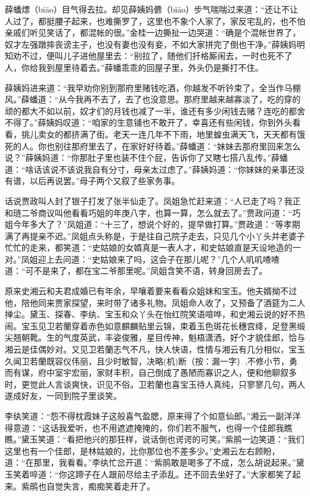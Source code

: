 \documentclass[12pt,oneside]{book}
\begin{document}
薛蟠熛（biāo）目气得去拉。却见薛姨妈儦（biāo）步气喘喘过来道：“还让不让人过了，都挺腰子起来，也难撕罗了，这里也不象个人家了，家反宅乱的，也不怕亲戚们听见笑话了，都混帐的很。”金桂一边撕扯一边哭道：“确是个混帐世界了，奴才左强蹾摔丧谤主子，也没有妻也没有妾，不如大家拼完了倒也干净。”薛姨妈明知劝不过，便叫儿子进他屋里去：“别拉了，随他们扞格厮闹去，一时也死不了人，你给我到屋里待着去。”薛蟠乖乖的回屋子里，外头仍是撕打不住。

薛姨妈进来道：“我早劝你别到那府里赌钱吃酒，你越发不听钤束了，全当作马棚风。”薛蟠道：“从今我再不去了，去了也没意思。那府里越来越寡淡了，吃的穿的顽的都大不如以前，奴才们的月钱也减了一半，谁还有多少闲钱去赌？连吃的都舍不得了。”薛姨妈叹道：“咱家的生意铺也不敢开了，幸喜还有些闲钱，你到外头看看，挑儿卖女的都挤满了街。老天一连几年不下雨，地里蝗虫满天飞，天天都有饿死的人。你也别往那府里去了，在家好好待着。”薛蟠道：“妹妹去那府里回来怎么说？”薛姨妈道：“你那肚子里也装不住个屁，告诉你了又瞎七搭八乱传。”薛蟠道：“啥话该说不该说我自有分寸，母亲太过虑了。”薛姨妈道：“你妹妹的亲事还没有谱，以后再说罢。”母子两个又叙了些家务事。

话说贾政叫人封了银子打发了张半仙走了。凤姐急忙赶来道：“人已走了吗？我正和琏二爷商议叫他看看巧姐的年庚八字，也算一算，怎么就去了。”贾政问道：“巧姐今年多大了？”凤姐道：“十三了，想说个好的，提早做打算。”贾政道：“等孝期满了再提亲不迟。”凤姐点头称是，于是往自己院子走去，只见几个小丫头并老婆子忙忙的走来，都笑道：“史姑娘的女婿真是一表人才，和史姑娘直是天设地造的一对。”凤姐迎上去问道：“史姑娘来了吗，这会子在那儿呢？”几个人叽叽喳喳道：“可不是来了，都在宝二爷那里呢。”凤姐含笑不语，转身回房去了。

原来史湘云和夫君成婚已有年余，早嚷着要来看看众姐妹和宝玉。他夫婿拗不过他，陪他同来贾家探望，来时带了诸多礼物。凤姐命人收了，又预备了酒筵为二人掸尘。黛玉、探春、李纨、宝玉和众丫头在怡红院笑语喧哗，和史湘云说的好不热闹。宝玉见卫若蘭穿着赤色如意麒麟贴里云锦，束着玉色斑花长穗宫绛，足登黑缎尖翘朝靴。生的气度英武，丰姿俊雅，星目传神，魁梧潇洒，好个才貌佳郎，恰与湘云是佳偶妙对。又见卫若蘭志气不凡，快人快语，性情与湘云有几分相似，宝玉久闻卫若蘭既容仪伟丽，且少时敏智，决略(机)断（按：漏一字）,不修小节，勇而有谋，府中室宇宏丽，家财丰积，自己倒成了愚陋而寡识之人，便和他聊叙多时，更觉此人言谈爽快，识见不俗。卫若蘭也喜宝玉待人真纯，只寥寥几句，两人遂成好友，一同到院子里谈笑。

李纨笑道：“怨不得枕霞妹子这般喜气盈腮，原来得了个如意仙郎。”湘云一副洋洋得意道：“这话我爱听，也不用遮遮掩掩的，你们若不服气，也得一个佳郎我瞧瞧。”黛玉笑道：“看把他兴的那狂样，说话倒也谔谔的可笑。”紫鹃一边笑道：“我们这里也有一个佳郎，是林姑娘的，比你那位也不差多少。”史湘云左右顾盼，道：“在那里，我看看。”李纨忙岔开道：“紫鹃敢是喝多了不成，怎么胡说起来。”黛玉笑着啐道：“你这蹄子在人跟前尽给主子添乱。还不回去坐好了。”大家都笑了起来。紫鹃也自觉失言，痴痴笑着走开了。
\end{document}
